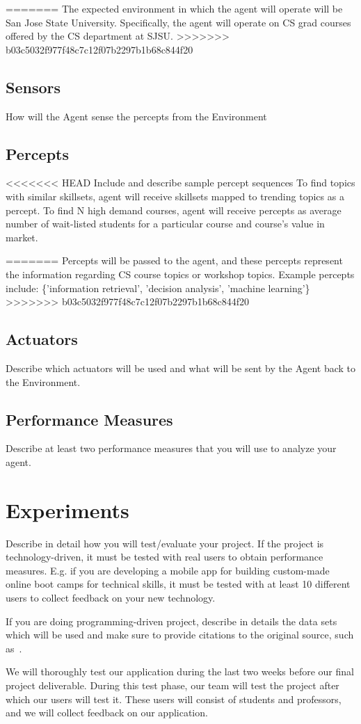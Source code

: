 \documentclass{article}
\begin{document}
=======
The expected environment in which the agent will operate will be San Jose State University. Specifically, the agent will operate on CS grad courses offered by the CS department at SJSU. 
>>>>>>> b03c5032f977f48c7c12f07b2297b1b68c844f20
\subsection{Sensors}
How will the Agent sense the percepts from the Environment


\subsection{Percepts}
<<<<<<< HEAD
Include and describe sample percept sequences
To find topics with similar skillsets, agent will receive skillsets mapped to trending topics as a percept.
To find N high demand courses, agent will receive percepts as average number of wait-listed students for a particular course and course's value in market.

=======
Percepts will be passed to the agent, and these percepts represent the information regarding CS course topics or workshop topics. Example percepts include: 
\{'information retrieval', 'decision analysis', 'machine learning'\}
>>>>>>> b03c5032f977f48c7c12f07b2297b1b68c844f20
\subsection{Actuators}
Describe which actuators will be used and what will be sent by the Agent back to the Environment.
\subsection{Performance Measures}
Describe at least two performance measures that you will use to analyze your agent.

\section{Experiments}
Describe in detail how you will test/evaluate your project.
If the project is technology-driven, it must be tested with real users to obtain performance measures.  E.g. if you are developing a mobile app for building custom-made online boot camps for technical skills, it must be tested with at least 10 different users to collect feedback on your new technology.

If you are doing programming-driven project, describe in details the data sets which will be used and make sure to provide citations to the original source, such as~\cite{knuthwebsite}. 

We will thoroughly test our application during the last two weeks before our final project deliverable. During this test phase, our team will test the project after which our users will test it. These users will consist of students and professors, and we will collect feedback on our application. 

 

\end{document}
